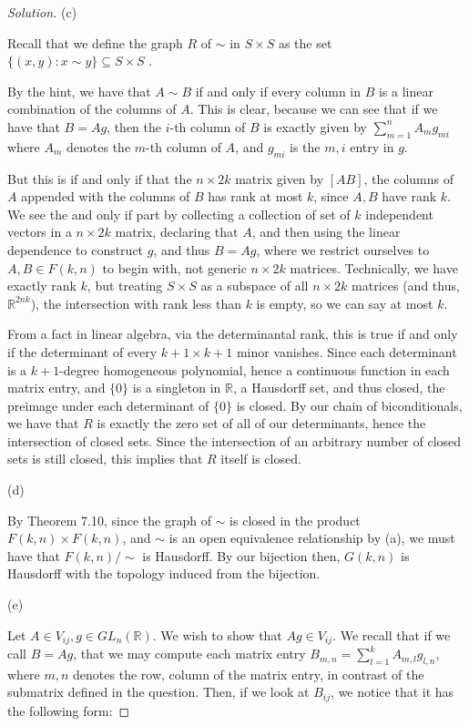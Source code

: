 \documentclass[10pt]{article}
\begin{document}
\begin{proof}[Solution]
(c)

Recall that we define the graph $R$ of $\sim$ in $S \times S$ as the set  $\{ (x,y) : x \sim y \} \subseteq S \times S$ .

By the hint, we have that $A \sim B$ if and only if every column in $B$ is a linear combination of the columns of $A$. This is clear, because we can see that if we have that $B = Ag$, then the $i$-th column of $B$ is exactly given by $\sum_{m=1}^n A_{m}g_{mi}$ where $A_m$ denotes the $m$-th column of $A$, and $g_{mi}$ is the $m,i$ entry in $g$.

But this is if and only if that the $n \times 2k$ matrix given by $[ A B ]$, the columns of $A$ appended with the columns of $B$ has rank at most $k$, since $A,B$ have rank $k$. We see the and only if part by collecting a collection of set of $k$ independent vectors in a $n \times 2k$ matrix, declaring that $A$, and then using the linear dependence to construct $g$, and thus $B = Ag$, where we restrict ourselves to $A, B \in F(k,n)$ to begin with, not generic $n \times 2k$ matrices. Technically, we have exactly rank $k$, but treating $S \times S$ as a subspace of all $n \times 2k$ matrices (and thus, $\mathbb{R}^{2nk}$), the intersection with rank less than $k$ is empty, so we can say at most $k$.

From a fact in linear algebra, via the determinantal rank, this is true if and only if the determinant of every $k+1 \times k+1$ minor vanishes. Since each determinant is a $k+1$-degree homogeneous polynomial, hence a continuous function in each matrix entry, and $\{ 0 \}$ is a singleton in $\mathbb{R}$, a Hausdorff set, and thus closed, the preimage under each determinant of $\{ 0 \}$ is closed. By our chain of biconditionals, we have that $R$ is exactly the zero set of all of our determinants, hence the intersection of closed sets. Since the intersection of an arbitrary number of closed sets is still closed, this implies that $R$ itself is closed.

(d)

By Theorem 7.10, since the graph of $\sim$ is closed in the product $F(k,n) \times F(k,n)$, and $\sim$ is an open equivalence relationship by (a), we must have that $F(k,n)/ \sim$ is Hausdorff. By our bijection then, $G(k,n)$ is Hausdorff with the topology induced from the bijection.

(e)

Let $A \in V_{ij}, g \in GL_n(\mathbb{R})$. We wish to show that $Ag \in V_{ij}$. We recall that if we call $B = Ag$, that we may compute each matrix entry $B_{m,n} =  \sum_{l=1}^k A_{m,l}g_{l,n}$, where $m,n$ denotes the row, column of the matrix entry, in contrast of the submatrix defined in the question. Then, if we look at $B_{ij}$, we notice that it has the following form:


\end{proof}
\end{document}
